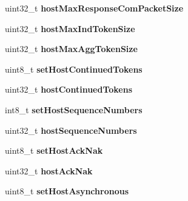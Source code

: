 \begin{DoxyCompactItemize}
\item 
\hypertarget{structsedContext_a486e0dc3f54e17fd03ae619b0ce44f8c}{}uint32\+\_\+t {\bfseries host\+Max\+Response\+Com\+Packet\+Size}\label{structsedContext_a486e0dc3f54e17fd03ae619b0ce44f8c}

\item 
\hypertarget{structsedContext_a14a5fff97512e644e382a85c0bbd85e6}{}uint32\+\_\+t {\bfseries host\+Max\+Ind\+Token\+Size}\label{structsedContext_a14a5fff97512e644e382a85c0bbd85e6}

\item 
\hypertarget{structsedContext_a3074e68a13a7589f65a159c9687b1ba8}{}uint32\+\_\+t {\bfseries host\+Max\+Agg\+Token\+Size}\label{structsedContext_a3074e68a13a7589f65a159c9687b1ba8}

\item 
\hypertarget{structsedContext_a6bcb8cb59d9d417b4a99b60a00e0eb49}{}uint8\+\_\+t {\bfseries set\+Host\+Continued\+Tokens}\label{structsedContext_a6bcb8cb59d9d417b4a99b60a00e0eb49}

\item 
\hypertarget{structsedContext_a48a06d622b16930bb4f1731c3242de91}{}uint32\+\_\+t {\bfseries host\+Continued\+Tokens}\label{structsedContext_a48a06d622b16930bb4f1731c3242de91}

\item 
\hypertarget{structsedContext_ac76c044ff8bbb75e1fb0f10d7d6afe85}{}int8\+\_\+t {\bfseries set\+Host\+Sequence\+Numbers}\label{structsedContext_ac76c044ff8bbb75e1fb0f10d7d6afe85}

\item 
\hypertarget{structsedContext_a0df32f7140f9cde884a0963de5796b57}{}uint32\+\_\+t {\bfseries host\+Sequence\+Numbers}\label{structsedContext_a0df32f7140f9cde884a0963de5796b57}

\item 
\hypertarget{structsedContext_a19f4b9981e1749f24b4ca539e891961c}{}uint8\+\_\+t {\bfseries set\+Host\+Ack\+Nak}\label{structsedContext_a19f4b9981e1749f24b4ca539e891961c}

\item 
\hypertarget{structsedContext_aa2a73d6cc4a518b36c98e3465514f2e7}{}uint32\+\_\+t {\bfseries host\+Ack\+Nak}\label{structsedContext_aa2a73d6cc4a518b36c98e3465514f2e7}

\item 
\hypertarget{structsedContext_a326896d58752d0f585764f1773f02548}{}uint8\+\_\+t {\bfseries set\+Host\+Asynchronous}\label{structsedContext_a326896d58752d0f585764f1773f02548}


\end{DoxyCompactItemize}
